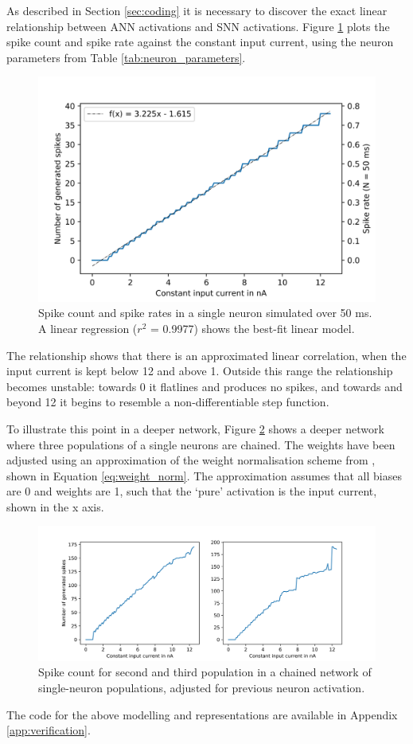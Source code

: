 
As described in Section \ref{sec:coding} it is necessary to discover the exact
linear relationship between \gls{ANN} activations and \gls{SNN} activations.
Figure \ref{fig:spike_rates} plots the spike count and spike rate against the
constant input current, using the neuron parameters from Table \ref{tab:neuron_parameters}.

\begin{figure}
  \centering
  \includegraphics[width=\textwidth]{images/spike_rate.png}
  \caption{Spike count and spike rates in a single neuron simulated over 50 ms.
  A linear regression ($r^2$ = 0.9977) shows the best-fit linear model.}
  \label{fig:spike_rates}
\end{figure}

The relationship shows that there is an approximated linear correlation, when the
input current is kept below 12 and above 1.
Outside this range the relationship becomes unstable: towards 0 it flatlines and
produces no spikes, and towards and beyond 12 it begins to resemble a non-differentiable 
step function.

To illustrate this point in a deeper network, Figure \ref{fig:spike_rates2} shows
a deeper network where three populations of a single neurons are chained.
The weights have been adjusted using an approximation of the weight normalisation scheme
from \textcite{Rueckauer2017}, shown in Equation \ref{eq:weight_norm}.
The approximation assumes that all biases are 0 and weights are 1, such that
the `pure' activation is the input current, shown in the x axis.

\begin{figure}
  \centering
  \includegraphics[width=\textwidth]{images/spike_rate2.png}
  \caption{Spike count for second and third population in a chained network of
  single-neuron populations, adjusted for previous neuron activation.}
  \label{fig:spike_rates2}
\end{figure}

The code for the above modelling and representations are available in Appendix
\ref{app:verification}.
